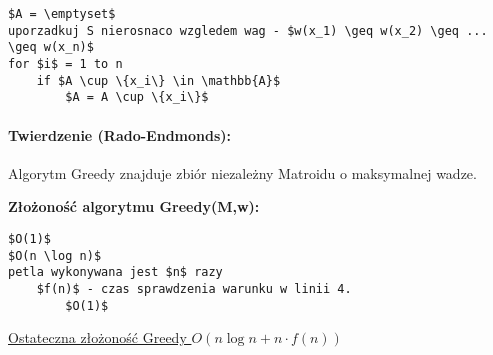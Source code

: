 \begin{lstlisting}[caption={Greedy(M,w)}]
$A = \emptyset$
uporzadkuj S nierosnaco wzgledem wag - $w(x_1) \geq w(x_2) \geq ... \geq w(x_n)$
for $i$ = 1 to n
	if $A \cup \{x_i\} \in \mathbb{A}$
		$A = A \cup \{x_i\}$
\end{lstlisting}

\paragraph{Twierdzenie (Rado-Endmonds):} {Algorytm Greedy znajduje zbiór niezależny Matroidu o maksymalnej wadze.} \label{tw:RadoEndmonds}

\textbf{Złożoność algorytmu Greedy(M,w):}
\begin{lstlisting}
$O(1)$
$O(n \log n)$
petla wykonywana jest $n$ razy
	$f(n)$ - czas sprawdzenia warunku w linii 4. 
		$O(1)$
\end{lstlisting}
\underline{Ostateczna złożoność Greedy $O(n \log n + n \cdot f(n))$}
